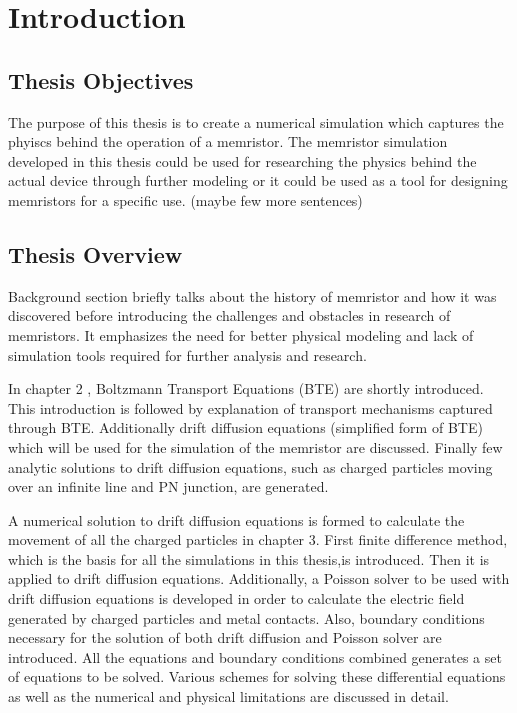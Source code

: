 
\chapter{Introduction} %

\label{Chapter1} %


\section{Thesis Objectives}

The purpose of this thesis is to create a numerical simulation which captures the phyiscs behind the operation of a memristor. The memristor simulation developed in this thesis could be used for researching the physics behind the actual device through further modeling or it could be used as a tool for designing memristors for a specific use. (maybe few more sentences)

\section{Thesis Overview}

Background section briefly talks about the history of memristor and how it was discovered before introducing the challenges and obstacles in research of memristors. It emphasizes the need for better physical modeling and lack of simulation tools required for further analysis and research.

In chapter 2 , Boltzmann Transport Equations (BTE) are shortly introduced. This introduction is followed by explanation of transport mechanisms captured through BTE. Additionally drift diffusion equations (simplified form of BTE) which will be used for the simulation of the memristor are discussed. Finally few analytic solutions to drift diffusion equations, such as charged particles moving over an infinite line and PN junction, are generated. 

A numerical solution to drift diffusion equations is formed to calculate the movement of all the charged particles in chapter 3. First finite difference method, which is the basis for all the simulations in this thesis,is introduced. Then it is applied to drift diffusion equations. Additionally, a Poisson solver to be used with drift diffusion equations is developed in order to calculate the electric field generated by charged particles and metal contacts. Also, boundary conditions necessary for the solution of both drift diffusion and Poisson solver are introduced. All the equations and boundary conditions combined generates a set of equations to be solved. Various schemes for solving these differential equations as well as the numerical and physical limitations are discussed in detail.
 
